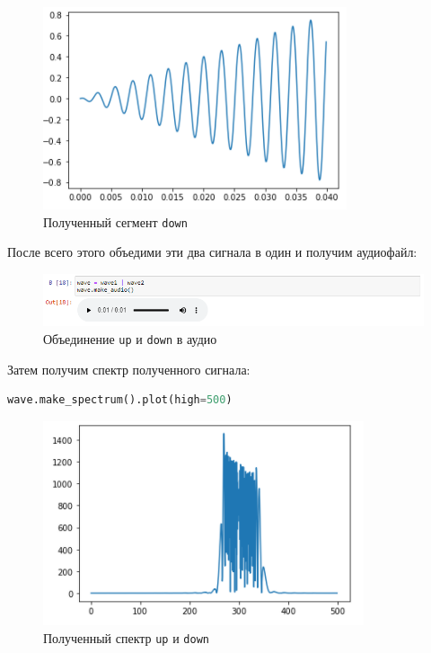 \documentclass[a4paper]{article}
\begin{document}
             \begin{figure}[H]
                \centering
                \includegraphics{ex_5_signal_down_segment.png}
                \caption{Полученный сегмент \texttt{down}}
                \label{fig:ex_5_signal_down_segment}
            \end{figure}
            
            После всего этого объедими эти два сигнала в один и получим аудиофайл:
            
            \begin{figure}[H]
                \centering
                \includegraphics[width=\textwidth]{ex_5_signal_up_down_audio.png}
                \caption{Объединение \texttt{up} и \texttt{down} в аудио}
                \label{fig:ex_5_signal_up_down_audio}
            \end{figure}
            
            Затем получим спектр полученного сигнала:
            
\begin{lstlisting}[language=Python, caption= Спектр сигнала \texttt{up} и \texttt{down}]
    wave.make_spectrum().plot(high=500)
\end{lstlisting}   
            
             \begin{figure}[H]
                \centering
                \includegraphics{ex_5_signal_up_down_spectr.png}
                \caption{Полученный спектр \texttt{up} и \texttt{down}}
                \label{fig:ex_5_signal_up_down_spectr}
            \end{figure}
            
\end{document}
